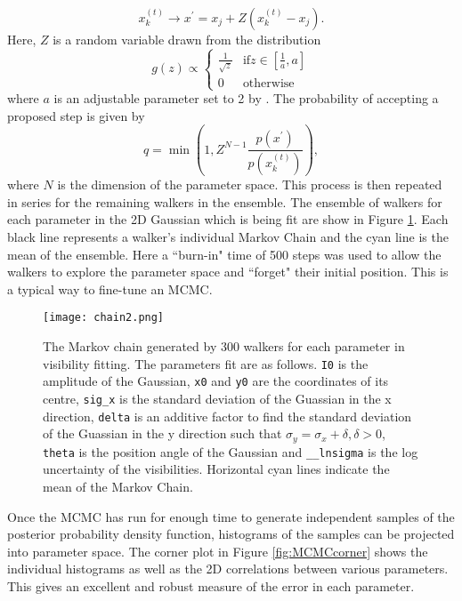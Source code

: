 \begin{equation}
\label{eq:MCMC_walkers}
x_k^{(t)} \rightarrow x^\prime = x_j + Z(x_k^{(t)} - x_j).
\end{equation}
Here, $Z$ is a random variable drawn from the distribution
\begin{equation}
\label{eq:MCMC_g}
g(z) \propto 
\begin{cases}
\frac{1}{\sqrt{z}} & \mbox{if} z \in \left[\frac{1}{a}, a \right] \\
0 & \mbox{otherwise}
\end{cases}
\end{equation}
where $a$ is an adjustable parameter set to 2 by \cite{Goodman2010}. The probability of accepting a proposed step is given by
\begin{equation}
\label{eq:MCMC_stretch_newstate}
q = \min \left(1, Z^{N-1} \frac{p(x^\prime)}{p(x_k^{(t)})}\right),
\end{equation} 
where $N$ is the dimension of the parameter space. This process is then repeated in series for the remaining walkers in the ensemble.
The ensemble of walkers for each parameter in the 2D Gaussian which is being fit are show in Figure \ref{fig:MCMCchain}. Each black line represents a walker's individual Markov Chain and the cyan line is the mean of the ensemble. Here a ``burn-in" time of 500 steps was used to allow the walkers to explore the parameter space and ``forget" their initial position. This is a typical way to fine-tune an MCMC. 
\begin{figure}
\centering
\texttt{[image: chain2.png]}
\caption[The Markov chain generated by 300 walkers for each parameter in visibility fitting.]{The Markov chain generated by 300 walkers for each parameter in visibility fitting. The parameters fit are as follows. \texttt{I0} is the amplitude of the Gaussian, \texttt{x0} and \texttt{y0} are the coordinates of its centre, \texttt{sig\_x} is the standard deviation of the Guassian in the x direction, \texttt{delta} is an additive factor to find the standard deviation of the Guassian in the y direction such that $\sigma_y = \sigma_x + \delta, \delta > 0$, \texttt{theta} is the position angle of the Gaussian and \texttt{\_\_lnsigma} is the log uncertainty of the visibilities. Horizontal cyan lines indicate the mean of the Markov Chain.}
\label{fig:MCMCchain}
\end{figure}

Once the MCMC has run for enough time to generate independent samples of the posterior probability density function, histograms of the samples can be projected into parameter space. The corner plot in Figure \ref{fig:MCMCcorner} shows the individual histograms as well as the 2D correlations between various parameters. This gives an excellent and robust measure of the error in each parameter.

